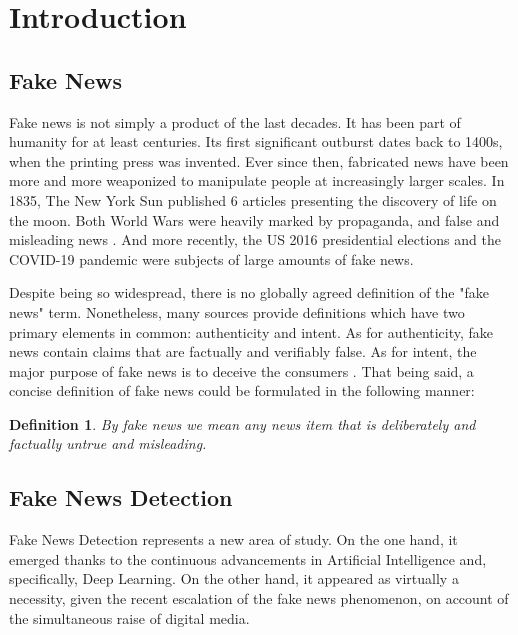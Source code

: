 \documentclass[12pt, a4paper]{article}
\newtheorem{definition}{Definition}
\begin{document}
  

  \tableofcontents
  \newpage

  \section{Introduction}
  \newpage

  

  \subsection{Fake News}
  Fake news is not simply a product of the last decades. It has been part of humanity for at least centuries. Its first significant outburst dates back to 1400s, when the printing press was invented. Ever since then, fabricated news have been more and more weaponized to manipulate people at increasingly larger scales. In 1835, The New York Sun published 6 articles presenting the discovery of life on the moon. Both World Wars were heavily marked by propaganda, and false and misleading news \cite{a4}. And more recently, the US 2016 presidential elections and the COVID-19 pandemic were subjects of large amounts of fake news.

  Despite being so widespread, there is no globally agreed definition of the "fake news" term. Nonetheless, many sources provide definitions which have two primary elements in common: authenticity and intent. As for authenticity, fake news contain claims that are factually and verifiably false. As for intent, the major purpose of fake news is to deceive the consumers \cite{a2}. That being said, a concise definition of fake news could be formulated in the following manner:

  \begin{definition}
    By fake news we mean any news item that is deliberately and factually untrue and misleading.
  \end{definition}

  \subsection{Fake News Detection}
  Fake News Detection represents a new area of study. On the one hand, it emerged thanks to the continuous advancements in Artificial Intelligence and, specifically, Deep Learning. On the other hand, it appeared as virtually a necessity, given the recent escalation of the fake news phenomenon, on account of the simultaneous raise of digital media.
\end{document}
